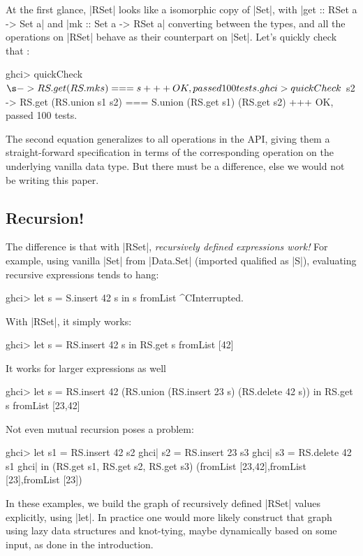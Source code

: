 \documentclass[manuscript,anonymous,screen,acmsmall]{acmart}
\begin{document}
At the first glance, |RSet| looks like a isomorphic copy of |Set|, with |get :: RSet a -> Set a| and |mk :: Set a -> RSet a| converting between the types, and all the operations on |RSet| behave as their counterpart on |Set|. Let's quickly check that \citep{quickcheck}:
\begin{code}
ghci> quickCheck $ \s -> RS.get (RS.mk s) === s
+++ OK, passed 100 tests.
ghci> quickCheck $  s2 -> RS.get (RS.union s1 s2) === S.union (RS.get s1) (RS.get s2)
+++ OK, passed 100 tests.
\end{code}

The second equation generalizes to all operations in the API, giving them a straight-forward specification in terms of the corresponding operation on the underlying vanilla data type. But there must be a difference, else we would not be writing this paper.

\subsection{Recursion!}

The difference is that with |RSet|, \emph{recursively defined expressions work!} For example, using vanilla |Set| from |Data.Set| (imported qualified as |S|), evaluating recursive expressions tends to hang:
\begin{code}
ghci> let s = S.insert 42 s in s
fromList ^CInterrupted.
\end{code}
With |RSet|, it simply works:
\begin{code}
ghci> let s = RS.insert 42 s in RS.get s
fromList [42]
\end{code}
It works for larger expressions as well
\begin{code}
ghci> let s = RS.insert 42 (RS.union (RS.insert 23 s) (RS.delete 42 s)) in RS.get s
fromList [23,42]
\end{code}
Not even mutual recursion poses a problem:
\begin{code}
ghci> let  s1 = RS.insert 42 s2
ghci|      s2 = RS.insert 23 s3
ghci|      s3 = RS.delete 42 s1
ghci| in (RS.get s1, RS.get s2, RS.get s3)
(fromList [23,42],fromList [23],fromList [23])
\end{code}

In these examples, we build the graph of recursively defined |RSet| values explicitly, using |let|. In practice one would more likely construct that graph using lazy data structures and knot-tying, maybe dynamically based on some input, as done in the introduction.
\end{document}
